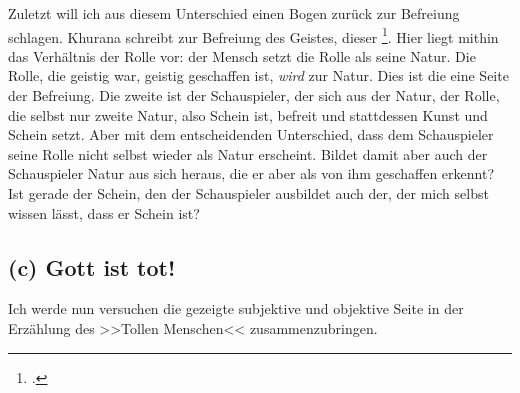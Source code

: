 \documentclass[12pt, a4paper, openany]{report}
\begin{document}
Zuletzt will ich aus diesem Unterschied einen Bogen zurück zur Befreiung schlagen.
Khurana schreibt zur Befreiung des Geistes, dieser \footcite[][393]{khurana_freiheit_2017}. 
Hier liegt mithin das Verhältnis der Rolle vor: 
der Mensch setzt die Rolle als seine Natur. 
Die Rolle, die geistig war, geistig geschaffen ist, \emph{wird} zur Natur. 
Dies ist die eine Seite der Befreiung. 
Die zweite ist der Schauspieler, der sich aus der Natur, der Rolle, die selbst nur zweite Natur, also Schein ist, befreit und stattdessen Kunst und Schein setzt. 
Aber mit dem entscheidenden Unterschied, dass dem Schauspieler seine Rolle nicht selbst wieder als Natur erscheint. 
Bildet damit aber auch der Schauspieler Natur aus sich heraus, die er aber als von ihm geschaffen erkennt? 
Ist gerade der Schein, den der Schauspieler ausbildet auch der, der mich selbst wissen lässt, dass er Schein ist?

\subsection{(c) Gott ist tot!}\label{abschnitt_2_3}
Ich werde nun versuchen die gezeigte subjektive und objektive Seite in der Erzählung des >>Tollen Menschen<< zusammenzubringen.
\end{document}
